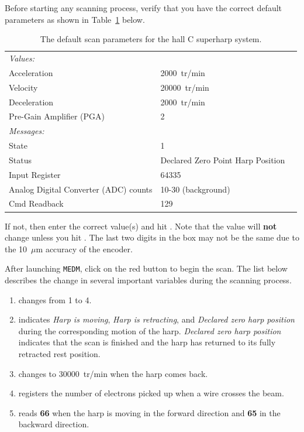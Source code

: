 Before starting any scanning process, verify that you have the correct default parameters as shown in
Table~\ref{table:scan_harp} below.
\begin{table}[!hbt]
\begin{center}
\begin{tabular}{llr}
\hline
\hline
{\it Values:}			&	\\ 
Acceleration			& 2000~tr/min	\\
Velocity			& 20000~tr/min	\\
Deceleration			& 2000~tr/min	\\
Pre-Gain Amplifier (PGA)	& 2	\\
\hline
\hline
{\it Messages:} 		&	\\
State				& 1	\\
Status				& Declared Zero Point Harp Position \\
Input Register			& 64335 \\
Analog Digital Converter (ADC) counts& 10-30 (background) \\
Cmd Readback			& 129	\\
\hline
\hline
\end{tabular}
	\caption{The default scan parameters for the hall C superharp system.}
	\label{table:scan_harp}
\end{center}
\end{table}
If not, then enter the correct value(s) and hit {\bf{}}. Note that the value will {\bf not}
change  unless you hit . The last two digits in the
{\bf{}} box may
not be the same due to the 10~$\mu$m accuracy of the encoder.

After launching {\tt MEDM}, click on the red {\bf{}} button to begin the scan. The list
below describes the  change in several important variables during the scanning process.
\begin{enumerate}
\item {} changes from 1 to 4.
\item {} indicates {\it Harp is moving}, {\it Harp is retracting}, and
	{\it Declared zero harp position} during the corresponding motion of the harp.
	{\it Declared zero harp position} indicates that the scan is finished and the harp has
	returned to its fully retracted rest position.
\item {} changes to 30000~tr/min when the harp comes back.
\item {} registers the number of electrons picked up when a wire crosses the beam.
\item {} reads {\bf 66} when the harp is moving in the forward direction
	and {\bf 65} in the backward direction.
\end{enumerate}



